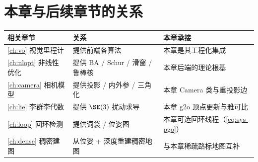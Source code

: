\section*{本章与后续章节的关系}
\begin{table}[H]\centering\small
\begin{tabular}{lll}
\toprule
相关章节 & 关系 & 本章承接 \\
\midrule
\cref{ch:vo} 视觉里程计 & 提供前端各算法 & 本章是其工程化集成 \\
\cref{ch:nlopt} 非线性优化 & 提供 BA / Schur / 滑窗 / 鲁棒核 & 本章后端的理论根基 \\
\cref{ch:camera} 相机模型 & 提供投影 / 内外参 / 三角化 & 本章 Camera 类与重投影边 \\
\cref{ch:lie} 李群李代数 & 提供 $\SE(3)$ 扰动求导 & 本章 g2o 顶点更新与雅可比 \\
\cref{ch:loop} 回环检测 & 提供词袋 / 位姿图 & 本章可选回环线程（\cref{eq:sys-pgo}） \\
\cref{ch:dense} 稠密建图 & 从位姿 + 深度重建稠密地图 & 与本章稀疏路标地图互补 \\
\bottomrule
\end{tabular}
\end{table}

